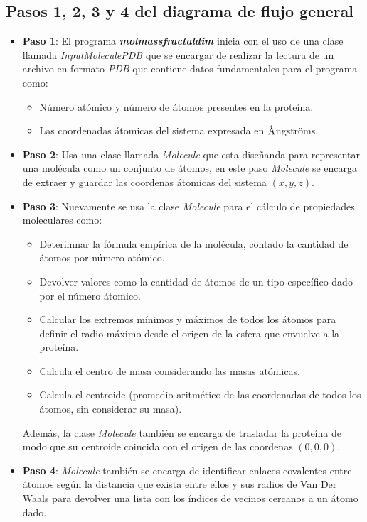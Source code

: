  
 \subsection {Pasos 1, 2, 3 y 4 del diagrama de flujo general}
 
	\begin{itemize}
		\item \textbf{Paso 1}:  El programa \textbf{\textit{molmassfractaldim}} inicia con el
		uso de una clase llamada \textit{InputMoleculePDB} que se encargar de realizar 
		la lectura de un archivo en formato \textit{PDB} que contiene datos 
		fundamentales para el programa como: 
		
		\begin{itemize}
			\item Número atómico y número de átomos presentes en la proteína.
			\item Las coordenadas átomicas del sistema expresada en $\textup{\r{A}}$ngstr\"oms.
		\end{itemize}
		
		\item \textbf{Paso 2}: Usa una clase llamada \textit{Molecule}
		que esta diseñanda para representar una molécula como un conjunto de 
		átomos, en este paso \textit{Molecule} se encarga de extraer y guardar las coordenas 
		átomicas del sistema $(x, y, z)$.\\
		
		\item \textbf{Paso 3}: Nuevamente se usa la clase 
		\textit{Molecule} para el cálculo de propiedades moleculares como:
		
		\begin{itemize}
			\item Deterimnar la fórmula empírica de la molécula, contado la cantidad de átomos por número 
			atómico.
			\item Devolver valores como la cantidad de átomos de un tipo específico 
			dado por el número átomico.
			\item Calcular los extremos mínimos y máximos de todos los átomos para definir 
			el radio máximo desde el origen de la esfera que envuelve a la proteína.
			\item Calcula el centro de masa considerando las masas atómicas.
			\item Calcula el centroide (promedio aritmético de las coordenadas de todos los
			átomos, sin considerar su masa).
		\end{itemize}
		
		Además, la clase \textit{Molecule} también se encarga de trasladar la proteína de 
		modo que su centroide coincida con el origen de las coordenas $(0, 0, 0)$.  
		
		
		\item \textbf{Paso 4}: \textit{Molecule} también se encarga de identificar enlaces 
		covalentes entre átomos según la distancia que exista entre ellos y 
		sus radios de Van Der Waals para devolver una lista con los índices de vecinos 
		cercanos a un átomo dado.
		
	\end{itemize}

